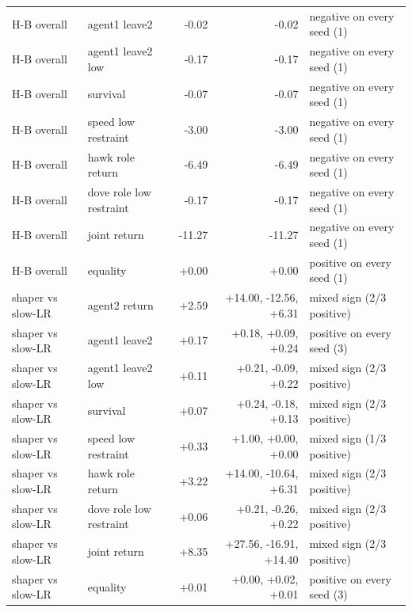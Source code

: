 \begin{tabular}{llrrl}
H-B overall & agent1 leave2 & -0.02 & -0.02 & negative on every seed (1) \\
H-B overall & agent1 leave2 low & -0.17 & -0.17 & negative on every seed (1) \\
H-B overall & survival & -0.07 & -0.07 & negative on every seed (1) \\
H-B overall & speed low restraint & -3.00 & -3.00 & negative on every seed (1) \\
H-B overall & hawk role return & -6.49 & -6.49 & negative on every seed (1) \\
H-B overall & dove role low restraint & -0.17 & -0.17 & negative on every seed (1) \\
H-B overall & joint return & -11.27 & -11.27 & negative on every seed (1) \\
H-B overall & equality & +0.00 & +0.00 & positive on every seed (1) \\
shaper vs slow-LR & agent2 return & +2.59 & +14.00, -12.56, +6.31 & mixed sign (2/3 positive) \\
shaper vs slow-LR & agent1 leave2 & +0.17 & +0.18, +0.09, +0.24 & positive on every seed (3) \\
shaper vs slow-LR & agent1 leave2 low & +0.11 & +0.21, -0.09, +0.22 & mixed sign (2/3 positive) \\
shaper vs slow-LR & survival & +0.07 & +0.24, -0.18, +0.13 & mixed sign (2/3 positive) \\
shaper vs slow-LR & speed low restraint & +0.33 & +1.00, +0.00, +0.00 & mixed sign (1/3 positive) \\
shaper vs slow-LR & hawk role return & +3.22 & +14.00, -10.64, +6.31 & mixed sign (2/3 positive) \\
shaper vs slow-LR & dove role low restraint & +0.06 & +0.21, -0.26, +0.22 & mixed sign (2/3 positive) \\
shaper vs slow-LR & joint return & +8.35 & +27.56, -16.91, +14.40 & mixed sign (2/3 positive) \\
shaper vs slow-LR & equality & +0.01 & +0.00, +0.02, +0.01 & positive on every seed (3) \\
\bottomrule
\end{tabular}
